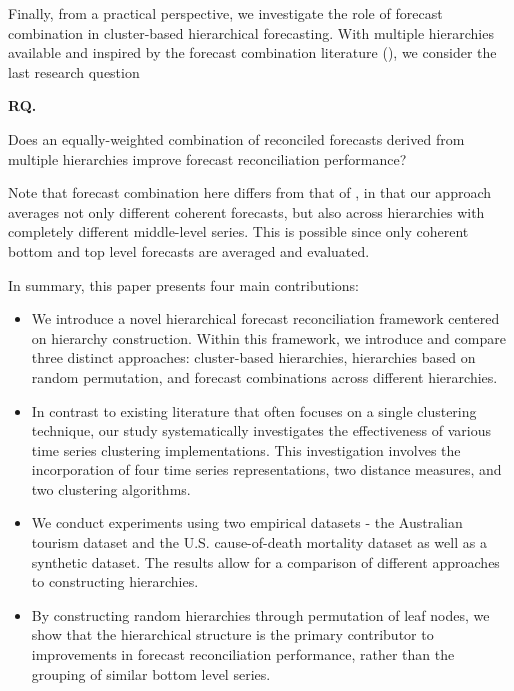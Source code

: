 \documentclass[a4paper,review,12pt,authoryear]{elsarticle}
\newcounter{researchquestion}
\newenvironment{researchquestion}{%
    \refstepcounter{researchquestion}%
    \par\medskip\noindent%
    \textbf{RQ\theresearchquestion.}~%
}{\medskip}
\begin{document}
Finally, from a practical perspective, we investigate the role of forecast combination in cluster-based hierarchical forecasting. With multiple hierarchies available and inspired by the forecast combination literature (\citealp{wangForecastCombinations50year2022}), we consider the last research question

\begin{researchquestion}
    Does an equally-weighted combination of reconciled forecasts derived from multiple hierarchies improve forecast reconciliation performance?
\end{researchquestion}

Note that forecast combination here differs from that of \cite{hollymanUnderstandingForecastReconciliation2021}, in that our approach averages not only different coherent forecasts, but also across hierarchies with completely different middle-level series. This is possible since only coherent bottom and top level forecasts are averaged and evaluated.


In summary, this paper presents four main contributions:

\begin{itemize}
  \item We introduce a novel hierarchical forecast reconciliation framework centered on hierarchy construction.  Within this framework, we introduce and compare three distinct approaches: cluster-based hierarchies, hierarchies based on random permutation, and  forecast combinations across different hierarchies.
  \item In contrast to existing literature that often focuses on a single clustering technique, our study systematically investigates the effectiveness of various time series clustering implementations. This investigation involves the incorporation of four time series representations, two distance measures, and two clustering algorithms.
  \item We conduct experiments using two empirical datasets - the Australian tourism dataset and the U.S. cause-of-death mortality dataset as well as a synthetic dataset. The results allow for a comparison of different approaches to constructing hierarchies.
  \item By constructing random hierarchies through permutation of leaf nodes, we show that the hierarchical structure is the primary contributor to improvements in forecast reconciliation performance, rather than the grouping of similar bottom level series. 

\end{itemize}
\end{document}
